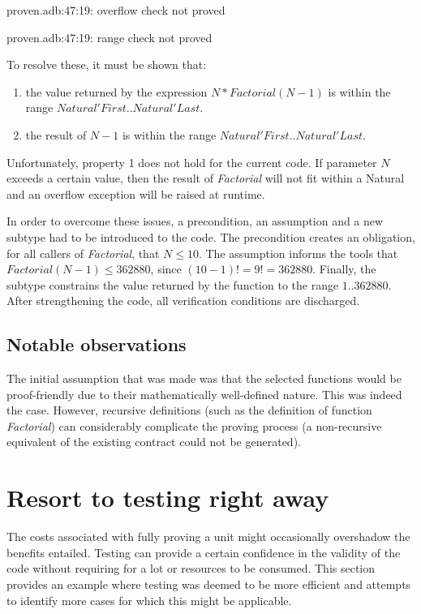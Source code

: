 \documentclass{llncs}
\begin{document}
proven.adb:47:19: overflow check not proved

proven.adb:47:19: range check not proved

\noindent
To resolve these, it must be shown that:
\begin{enumerate}
  \item the value returned by the expression $N * Factorial (N - 1)$ is within
    the range $Natural'First .. Natural'Last$.

  \item the result of $N - 1$ is within the range $Natural'First .. Natural'Last$.
\end{enumerate}
Unfortunately, property 1 does not hold for the current code. If parameter
$N$ exceeds a certain value, then the result of \emph{Factorial} will not fit
within a Natural and an overflow exception will be raised at runtime.

In order to overcome these issues, a precondition, an assumption and a new
subtype had to be introduced to the code. The precondition creates an obligation,
for all callers of \emph{Factorial}, that $N \leq 10$. The assumption informs the tools
that $Factorial (N - 1) \leq 362880$, since $(10 - 1)! = 9! = 362880$. Finally, the
subtype constrains the value returned by the function to the range $1 .. 362880$.
After strengthening the code, all verification conditions are discharged.




\subsection{Notable observations}
The initial assumption that was made was that the selected functions would be
proof-friendly due to their mathematically well-defined nature. This was indeed
the case. However, recursive definitions (such as the definition of function
\emph{Factorial}) can considerably complicate the proving process (a non-recursive
equivalent of the existing contract could not be generated).



\section{Resort to testing right away}
The costs associated with fully proving a unit might occasionally overshadow
the benefits entailed. Testing can provide a certain confidence in the validity of
the code without requiring for a lot or resources to be consumed. This section provides
an example where testing was deemed to be more efficient and attempts to identify more
cases for which this might be applicable.
\end{document}
